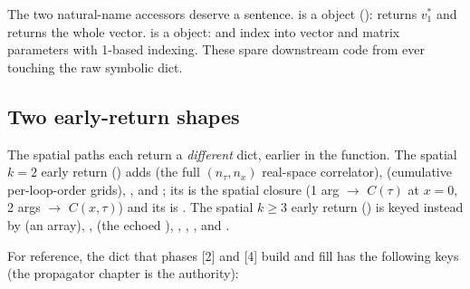 The two natural-name accessors deserve a sentence.  is a
 object ():  returns
$v^{*}_1$ and  returns the whole  vector.
 is a  object:  and
 index into vector and matrix parameters with 1-based
indexing. These spare downstream code from ever touching the raw symbolic dict.

\subsection{Two early-return shapes}\label{sec:co-datastructures}

The spatial paths each return a \emph{different} dict, earlier in the function.
The spatial $k=2$ early return () adds
 (the full $(n_\tau, n_x)$ real-space correlator),
 (cumulative per-loop-order grids),
, and ; its  is the spatial
closure (1 arg $\to$ $C(\tau)$ at $x=0$, 2 args $\to$ $C(x,\tau)$) and its
 is . The spatial $k\ge3$ early
return () is keyed instead by  (an
 array), ,  (the echoed
), , , , and
.

For reference, the  dict that phases [2] and [4] build and fill has the
following keys (the propagator chapter is the authority):


